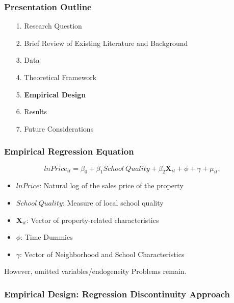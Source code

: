 \documentclass{beamer}
\begin{document}
\begin{frame}
\label{Presentation Outline 5}
\frametitle{Presentation Outline}
\begin{enumerate}
\item[1.] Research Question
\newline
\item[2.] Brief Review of Existing Literature and Background
\newline
\item[3.] Data
\newline
\item[4.] Theoretical Framework
\newline
\item[5.] \textbf{Empirical Design}
\newline
\item[6.] Results
\newline
\item[7.] Future Considerations
\end{enumerate}
\end{frame}

\begin{frame}
\label{Empirical Design}
\frametitle{Empirical Regression Equation}
\begin{equation}
\label{PrimaryEquation}
lnPrice_{it} = \beta_0  + \beta_1 School \ Quality + \beta_2 \mathbf{X}_{it} +  \phi + \gamma + \mu_{it},
\end{equation}
\begin{itemize}
\item $ln Price$: Natural log of the sales price of the property
\item $School \ Quality$: Measure of local school quality
\item $\mathbf{X}_{it}$: Vector of property-related characteristics
\item $\phi$: Time Dummies
\item $\gamma$: Vector of Neighborhood and School Characteristics \newline
\end{itemize}

\pause
However, omitted variables/endogeneity Problems remain.
\end{frame}

\begin{frame}
\label{Empirical Design RD Diagram}
\frametitle{Empirical Design: Regression Discontinuity Approach}
\end{frame}

\begin{frame}
\label{Empirical Design}
\end{frame}
\end{document}
